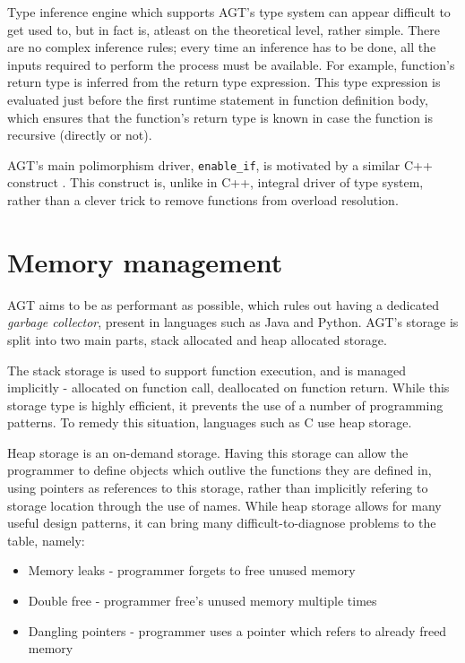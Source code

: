 \documentclass[times, utf8, diplomski]{fer}
\theoremstyle{definition}
\begin{document}
Type inference engine which supports AGT's type system can appear difficult to
get used to, but in fact is, atleast on the theoretical level, rather simple.
There are no complex inference rules;
every time an inference has to be done, all the inputs required to perform the process must be available.
For example, function's return type is inferred from the return type expression. 
This type expression is evaluated
just before the first runtime statement in function definition body, which
ensures that the function's return type is known in case the function is
recursive (directly or not).

AGT's main polimorphism driver, \texttt{enable\_if}, is motivated by a similar C++ construct
\citep{c_enable_if}. This construct is, unlike in C++, integral driver of type system,
rather than a clever trick to remove functions from overload resolution.

\section{Memory management}

AGT aims to be as performant as possible, which rules out having a dedicated \textit{garbage collector},
present in languages such as Java and Python. AGT's storage is split into two main parts,
stack allocated and heap allocated storage. 

The stack storage is used to support function
execution, and is managed implicitly - allocated on function call, deallocated on function return.
While this storage type is highly efficient, it prevents the use of a number of programming patterns.
To remedy this situation, languages such as C use heap storage. 

Heap storage is an on-demand storage. Having this storage can allow the programmer to define
objects which outlive the functions they are defined in, using pointers as references to this storage,
rather than implicitly refering to storage location through the use of names.
While heap storage allows for many useful design patterns, it can bring many difficult-to-diagnose
problems to the table, namely:

\begin{itemize}
    \item Memory leaks - programmer forgets to free unused memory
    \item Double free - programmer free's unused memory multiple times
    \item Dangling pointers - programmer uses a pointer which refers to already freed memory
\end{itemize}
\end{document}

